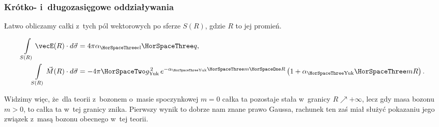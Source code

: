 \documentclass[10pt,t]{beamer}
\begin{document}
\begin{frame}
  \frametitle{Krótko- i~długozasięgowe oddziaływania}


  Łatwo obliczamy całki z~tych pól wektorowych po sferze $S( R )$, gdzie
  $R$ to jej promień.

  \vspace{-1.5em}


  \begin{subequations}

    \begin{align}
      \label{eq:Czym-sa-problemy-ETC-03}
      \int\limits_{ S( R ) } \vecE( R ) \cdot d\vec{ \sigma }
      &= 4 \pi \alpha_{ \HorSpaceThree \text{el} } \HorSpaceThree q, \\
      \int\limits_{ S( R ) } \vec{ M }( R ) \cdot d\vec{ \sigma }
      &=
        -4 \pi \HorSpaceTwo g_{ \text{Yuk} }^{ \, 2 } \,
        e^{ -\alpha_{ \HorSpaceThree \text{Yuk} } \HorSpaceThree m \HorSpaceOne R }
        \left( 1 + \alpha_{ \HorSpaceThree \text{Yuk} } \HorSpaceThree m R \right).
    \end{align}

  \end{subequations}

  \vspace{-1em}



  Widzimy więc, że~dla teorii z~bozonem o~masie spoczynkowej $m = 0$
  całka ta pozostaje stała w~granicy $R \nearrow +\infty$, lecz gdy masa bozonu
  $m > 0$, to całka ta w~tej granicy znika. Pierwszy wynik to dobrze nam
  znane prawo Gaussa, rachunek ten zaś miał służyć pokazaniu jego związek
  z~masą bozonu obecnego w~tej teorii.

\end{frame}
\end{document}
